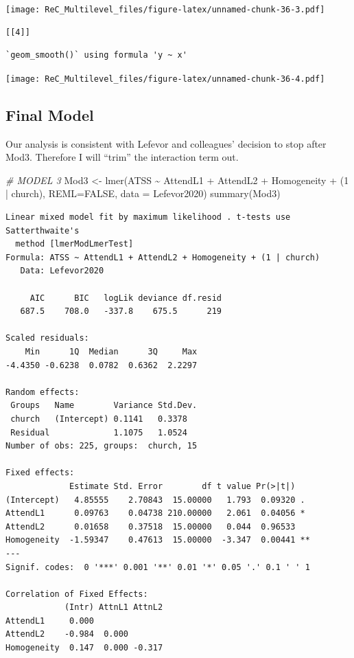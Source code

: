 \documentclass[
  11pt,
]{book}
\newenvironment{Shaded}{\begin{snugshade}}{\end{snugshade}}
\newcommand{\AttributeTok}[1]{\textcolor[rgb]{0.77,0.63,0.00}{#1}}
\newcommand{\CommentTok}[1]{\textcolor[rgb]{0.56,0.35,0.01}{\textit{#1}}}
\newcommand{\ConstantTok}[1]{\textcolor[rgb]{0.00,0.00,0.00}{#1}}
\newcommand{\DecValTok}[1]{\textcolor[rgb]{0.00,0.00,0.81}{#1}}
\newcommand{\FunctionTok}[1]{\textcolor[rgb]{0.00,0.00,0.00}{#1}}
\newcommand{\NormalTok}[1]{#1}
\newcommand{\OtherTok}[1]{\textcolor[rgb]{0.56,0.35,0.01}{#1}}
\newcommand{\SpecialCharTok}[1]{\textcolor[rgb]{0.00,0.00,0.00}{#1}}
\begin{document}
\texttt{[image: ReC\_Multilevel\_files/figure-latex/unnamed-chunk-36-3.pdf]}

\begin{verbatim}
[[4]]
\end{verbatim}

\begin{verbatim}
`geom_smooth()` using formula 'y ~ x'
\end{verbatim}

\texttt{[image: ReC\_Multilevel\_files/figure-latex/unnamed-chunk-36-4.pdf]}

\hypertarget{final-model}{%
\subsection{Final Model}\label{final-model}}

Our analysis is consistent with Lefevor and colleagues' decision to stop after Mod3. Therefore I will ``trim'' the interaction term out.

\begin{Shaded}
\begin{Highlighting}[]
\CommentTok{\# MODEL 3}
\NormalTok{Mod3 }\OtherTok{\textless{}{-}} \FunctionTok{lmer}\NormalTok{(ATSS }\SpecialCharTok{\textasciitilde{}}\NormalTok{ AttendL1 }\SpecialCharTok{+}\NormalTok{ AttendL2 }\SpecialCharTok{+}\NormalTok{ Homogeneity }\SpecialCharTok{+}\NormalTok{ (}\DecValTok{1} \SpecialCharTok{|}\NormalTok{ church), }\AttributeTok{REML=}\ConstantTok{FALSE}\NormalTok{, }\AttributeTok{data =}\NormalTok{ Lefevor2020)}
\FunctionTok{summary}\NormalTok{(Mod3)}
\end{Highlighting}
\end{Shaded}

\begin{verbatim}
Linear mixed model fit by maximum likelihood . t-tests use Satterthwaite's
  method [lmerModLmerTest]
Formula: ATSS ~ AttendL1 + AttendL2 + Homogeneity + (1 | church)
   Data: Lefevor2020

     AIC      BIC   logLik deviance df.resid 
   687.5    708.0   -337.8    675.5      219 

Scaled residuals: 
    Min      1Q  Median      3Q     Max 
-4.4350 -0.6238  0.0782  0.6362  2.2297 

Random effects:
 Groups   Name        Variance Std.Dev.
 church   (Intercept) 0.1141   0.3378  
 Residual             1.1075   1.0524  
Number of obs: 225, groups:  church, 15

Fixed effects:
             Estimate Std. Error        df t value Pr(>|t|)   
(Intercept)   4.85555    2.70843  15.00000   1.793  0.09320 . 
AttendL1      0.09763    0.04738 210.00000   2.061  0.04056 * 
AttendL2      0.01658    0.37518  15.00000   0.044  0.96533   
Homogeneity  -1.59347    0.47613  15.00000  -3.347  0.00441 **
---
Signif. codes:  0 '***' 0.001 '**' 0.01 '*' 0.05 '.' 0.1 ' ' 1

Correlation of Fixed Effects:
            (Intr) AttnL1 AttnL2
AttendL1     0.000              
AttendL2    -0.984  0.000       
Homogeneity  0.147  0.000 -0.317
\end{verbatim}
\end{document}
